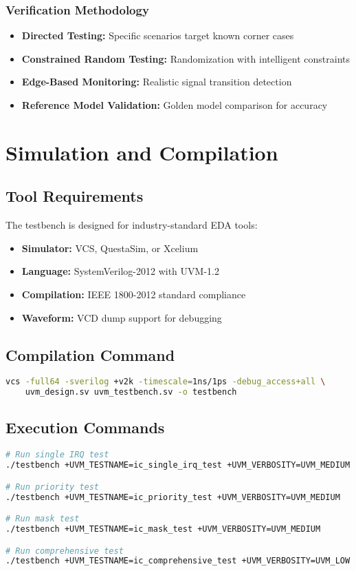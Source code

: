 \documentclass[12pt,a4paper]{article}
\begin{document}
\subsubsection{Verification Methodology}
\begin{itemize}
    \item \textbf{Directed Testing:} Specific scenarios target known corner cases
    \item \textbf{Constrained Random Testing:} Randomization with intelligent constraints
    \item \textbf{Edge-Based Monitoring:} Realistic signal transition detection
    \item \textbf{Reference Model Validation:} Golden model comparison for accuracy
\end{itemize}


\section{Simulation and Compilation}
\subsection{Tool Requirements}
The testbench is designed for industry-standard EDA tools:

\begin{itemize}
    \item \textbf{Simulator:} VCS, QuestaSim, or Xcelium
    \item \textbf{Language:} SystemVerilog-2012 with UVM-1.2
    \item \textbf{Compilation:} IEEE 1800-2012 standard compliance
    \item \textbf{Waveform:} VCD dump support for debugging
\end{itemize}

\subsection{Compilation Command}
\begin{lstlisting}[caption=VCS Compilation Command, language=bash]
vcs -full64 -sverilog +v2k -timescale=1ns/1ps -debug_access+all \
    uvm_design.sv uvm_testbench.sv -o testbench
\end{lstlisting}

\subsection{Execution Commands}
\begin{lstlisting}[caption=Test Execution Commands, language=bash]
# Run single IRQ test
./testbench +UVM_TESTNAME=ic_single_irq_test +UVM_VERBOSITY=UVM_MEDIUM

# Run priority test
./testbench +UVM_TESTNAME=ic_priority_test +UVM_VERBOSITY=UVM_MEDIUM

# Run mask test
./testbench +UVM_TESTNAME=ic_mask_test +UVM_VERBOSITY=UVM_MEDIUM

# Run comprehensive test
./testbench +UVM_TESTNAME=ic_comprehensive_test +UVM_VERBOSITY=UVM_LOW
\end{lstlisting}
\end{document}
